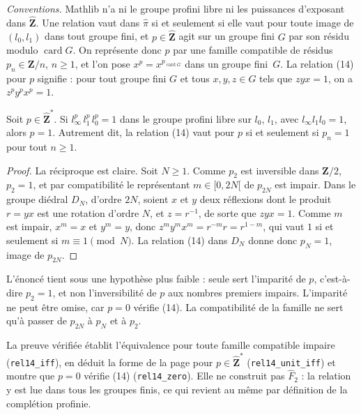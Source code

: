 \noindent\emph{Conventions.} Mathlib n'a ni le groupe profini libre ni les puissances d'exposant dans $\hat{\mathbf Z}$. Une relation vaut dans $\hat\pi$ si et seulement si elle vaut pour toute image de $(l_0, l_1)$ dans tout groupe fini, et $p \in \hat{\mathbf Z}$ agit sur un groupe fini $G$ par son résidu modulo $\operatorname{card} G$. On représente donc $p$ par une famille compatible de résidus $p_n \in \mathbf Z/n$, $n \geq 1$, et l'on pose $x^p = x^{p_{\operatorname{card} G}}$ dans un groupe fini~$G$. La relation (14) pour $p$ signifie : pour tout groupe fini $G$ et tous $x, y, z \in G$ tels que $zyx = 1$, on a $z^p y^p x^p = 1$.

\begin{encadre}
\begin{theoreme}\label{thm:145-exercice}
Soit $p \in \hat{\mathbf Z}^*$. Si $l_\infty^p\, l_1^p\, l_0^p = 1$ dans le groupe profini libre sur $l_0$, $l_1$, avec $l_\infty l_1 l_0 = 1$, alors $p = 1$. Autrement dit, la relation (14) vaut pour $p$ si et seulement si $p_n = 1$ pour tout $n \geq 1$.
\end{theoreme}
\end{encadre}

\begin{proof}
La réciproque est claire. Soit $N \geq 1$. Comme $p_2$ est inversible dans $\mathbf Z/2$, $p_2 = 1$, et par compatibilité le représentant $m \in [0, 2N[$ de $p_{2N}$ est impair. Dans le groupe diédral $D_N$, d'ordre $2N$, soient $x$ et $y$ deux réflexions dont le produit $r = yx$ est une rotation d'ordre $N$, et $z = r^{-1}$, de sorte que $zyx = 1$. Comme $m$ est impair, $x^m = x$ et $y^m = y$, donc $z^m y^m x^m = r^{-m} r = r^{1 - m}$, qui vaut $1$ si et seulement si $m \equiv 1 \pmod N$. La relation (14) dans $D_N$ donne donc $p_N = 1$, image de $p_{2N}$.
\end{proof}

\begin{remarque}
L'énoncé tient sous une hypothèse plus faible : seule sert l'imparité de $p$, c'est-à-dire $p_2 = 1$, et non l'inversibilité de $p$ aux nombres premiers impairs. L'imparité ne peut être omise, car $p = 0$ vérifie (14). La compatibilité de la famille ne sert qu'à passer de $p_{2N}$ à $p_N$ et à $p_2$.
\end{remarque}

\noindent La preuve vérifiée établit l'équivalence pour toute famille compatible impaire (\texttt{rel14\_iff}), en déduit la forme de la page pour $p \in \hat{\mathbf Z}^*$ (\texttt{rel14\_unit\_iff}) et montre que $p = 0$ vérifie (14) (\texttt{rel14\_zero}). Elle ne construit pas $\hat F_2$ : la relation y est lue dans tous les groupes finis, ce qui revient au même par définition de la complétion profinie.

